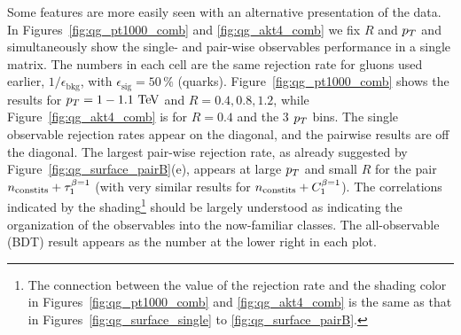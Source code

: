 Some features are more easily seen with an alternative presentation of
the data. In Figures~\ref{fig:qg_pt1000_comb} and
\ref{fig:qg_akt4_comb} we fix $R$ and $p_T$ and simultaneously show the single- and pair-wise observables performance in a single matrix.  
The numbers in each cell are the same rejection rate for gluons used earlier,
 $1/\epsilon_\text{bkg}$, with $\epsilon_\text{sig}= 50\,\% $ (quarks).  Figure~\ref{fig:qg_pt1000_comb} shows the results for $\pt=1-1.1 \TeV$ and
$R =0.4,0.8,1.2$, while  Figure~\ref{fig:qg_akt4_comb} is for $R = 0.4$ and the 3 $p_T$ bins.  The single observable rejection rates appear on the 
diagonal, and the pairwise results are off the diagonal.  The largest pair-wise rejection rate, as already suggested by Figure~\ref{fig:qg_surface_pairB}(e),
appears at large $p_T$ and small $R$ for the pair $n_ {\rm constits}+ \tau_1^{\beta=1}$ 
(with very similar results for $n_ {\rm constits}+ C_1^{\beta=1}$). 
The correlations indicated by the shading\footnote{The connection between the value of the rejection rate and the shading color in 
Figures~\ref{fig:qg_pt1000_comb} and \ref{fig:qg_akt4_comb} is the same as that in Figures~\ref{fig:qg_surface_single} to \ref{fig:qg_surface_pairB}.}   
should be largely understood as indicating the organization of the observables into the now-familiar
classes.  The all-observable (BDT) result appears as the number at the lower right in each plot.


